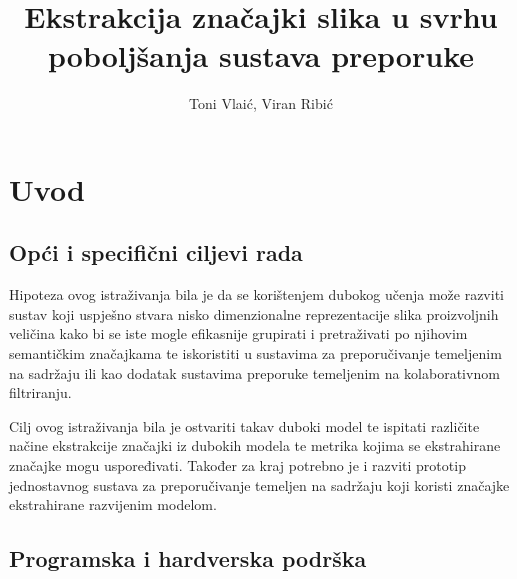 \documentclass[times, utf8, proizvoljni, numeric]{fer}
\begin{document}
\title{Ekstrakcija značajki slika u svrhu poboljšanja sustava preporuke}
\author{Toni Vlaić, Viran Ribić}

\maketitle

\thispagestyle{empty}

\tableofcontents
\thispagestyle{empty}
\listoftables
\thispagestyle{empty}
\listoffigures
\thispagestyle{empty}
\chapter{Uvod}


\section{Opći i specifični ciljevi rada}

Hipoteza ovog istraživanja bila je da se korištenjem dubokog učenja može razviti sustav koji uspješno stvara nisko dimenzionalne reprezentacije slika proizvoljnih veličina kako bi se iste mogle efikasnije grupirati i pretraživati po njihovim semantičkim značajkama te iskoristiti u sustavima za preporučivanje temeljenim na sadržaju ili kao dodatak sustavima preporuke temeljenim na kolaborativnom filtriranju.

Cilj ovog istraživanja bila je ostvariti takav duboki model te ispitati različite načine ekstrakcije značajki iz dubokih modela te metrika kojima se ekstrahirane značajke mogu uspoređivati. Također za kraj potrebno je i razviti prototip jednostavnog sustava za preporučivanje temeljen na sadržaju koji koristi značajke ekstrahirane razvijenim modelom.

\section{Programska i hardverska podrška}
\end{document}

